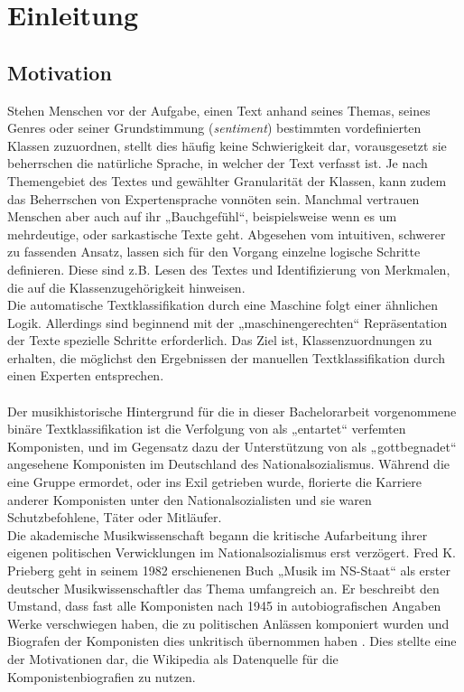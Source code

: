 \documentclass[ngerman]{ttlab-qualify}
\begin{document}
\tableofcontents

\chapter{Einleitung}

\section{Motivation}
Stehen Menschen vor der Aufgabe, einen Text anhand seines Themas, seines Genres oder seiner Grundstimmung (\textit{sentiment}) bestimmten vordefinierten Klassen zuzuordnen, stellt dies häufig keine Schwierigkeit dar, vorausgesetzt sie beherrschen die natürliche Sprache, in welcher der Text verfasst ist. Je nach Themengebiet des Textes und gewählter Granularität der Klassen, kann zudem das Beherrschen von Expertensprache vonnöten sein. Manchmal vertrauen Menschen aber auch auf ihr „Bauchgefühl“, beispielsweise wenn es um mehrdeutige, oder sarkastische Texte geht. Abgesehen vom intuitiven, schwerer zu fassenden Ansatz, lassen sich für den Vorgang einzelne logische Schritte definieren. Diese sind z.B. Lesen des Textes und Identifizierung von Merkmalen, die auf die Klassenzugehörigkeit hinweisen.\\
Die automatische Textklassifikation durch eine Maschine folgt einer ähnlichen Logik. Allerdings sind beginnend mit der „maschinengerechten“ Repräsentation der Texte spezielle Schritte erforderlich. Das Ziel ist, Klassenzuordnungen zu erhalten, die möglichst den Ergebnissen der manuellen Textklassifikation durch einen Experten entsprechen.\\
\\
Der musikhistorische Hintergrund für die in dieser Bachelorarbeit vorgenommene binäre Textklassifikation ist die Verfolgung von als „entartet“ verfemten Komponisten, und im Gegensatz dazu der Unterstützung von als „gottbegnadet“ angesehene Komponisten im Deutschland des Nationalsozialismus. Während die eine Gruppe ermordet, oder ins Exil getrieben wurde, florierte die Karriere anderer Komponisten unter den Nationalsozialisten und sie waren Schutzbefohlene, Täter oder Mitläufer.\\
Die akademische Musikwissenschaft begann die kritische Aufarbeitung ihrer eigenen politischen Verwicklungen im Nationalsozialismus erst verzögert. Fred K. Prieberg geht in seinem 1982 erschienenen Buch „Musik im NS-Staat“ \parencite{prieberg1982musik} als erster deutscher Musikwissenschaftler das Thema umfangreich an. Er beschreibt den Umstand, dass fast alle Komponisten nach 1945 in autobiografischen Angaben Werke verschwiegen haben, die zu politischen Anlässen komponiert wurden und Biografen der Komponisten dies unkritisch übernommen haben \parencite{prieberg1982musik}. Dies stellte eine der Motivationen dar, die Wikipedia als Datenquelle für die Komponistenbiografien zu nutzen.
\end{document}
